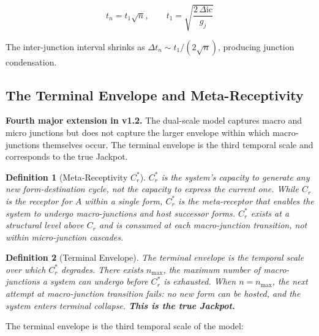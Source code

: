 \documentclass[12pt,a4paper]{article}
\newtheorem{definition}{Definition}[section]
\newcommand{\reag}{C_r}
\newcommand{\reagmeta}{C_r^{*}}
\newcommand{\gj}{g_j}
\newcommand{\Mpot}{A}
\newcommand{\nmax}{n_{\mathrm{max}}}
\begin{document}
\begin{equation}\label{eq:micro}
t_n = t_1 \sqrt{n}, \qquad t_1 = \sqrt{\frac{2\,\Delta\mathrm{ic}}{\gj}}
\end{equation}

The inter-junction interval shrinks as $\Delta t_n \sim t_1 / (2\sqrt{n})$, producing junction condensation.

\subsection{The Terminal Envelope and Meta-Receptivity}\label{subsec:terminal}

\textbf{Fourth major extension in v1.2.} The dual-scale model captures macro and micro junctions but does not capture the larger envelope within which macro-junctions themselves occur. The terminal envelope is the third temporal scale and corresponds to the true Jackpot.

\begin{definition}[Meta-Receptivity $\reagmeta$]\label{def:cmeta}
$\reagmeta$ is the system's capacity to generate \emph{any} new form-destination cycle, not the capacity to express the current one. While $\reag$ is the receptor for $\Mpot$ within a single form, $\reagmeta$ is the meta-receptor that enables the system to undergo macro-junctions and host successor forms. $\reagmeta$ exists at a structural level above $\reag$ and is consumed at each macro-junction transition, not within micro-junction cascades.
\end{definition}

\begin{definition}[Terminal Envelope]\label{def:terminal}
The terminal envelope is the temporal scale over which $\reagmeta$ degrades. There exists $\nmax$, the maximum number of macro-junctions a system can undergo before $\reagmeta$ is exhausted. When $n = \nmax$, the next attempt at macro-junction transition fails: no new form can be hosted, and the system enters terminal collapse. \textbf{This is the true Jackpot.}
\end{definition}

The terminal envelope is the third temporal scale of the model:
\end{document}
